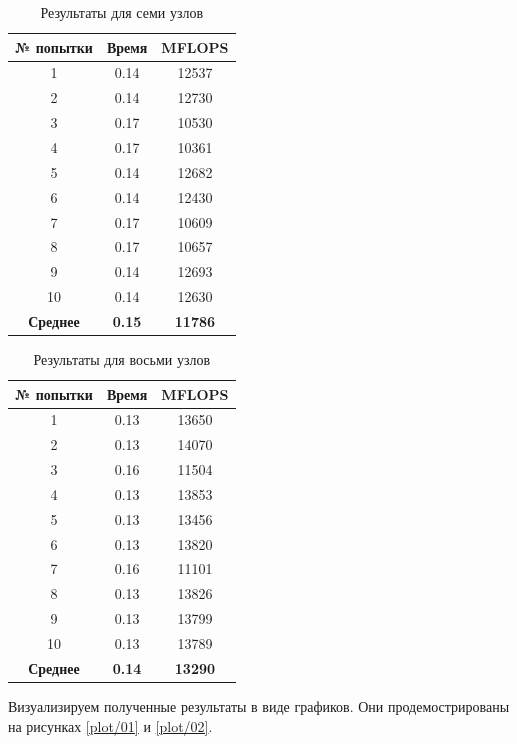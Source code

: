 \begin{table}[H]
	\caption{Результаты для семи узлов}
	\centering
	\begin{tabular}{|c|c|c|}
		\hline
		\textbf{№ попытки} & \textbf{Время} & \textbf{MFLOPS} \\\hline
		1 & 0.14 & 12537 \\ \hline
		2 & 0.14 & 12730 \\ \hline
		3 & 0.17 & 10530 \\ \hline
		4 & 0.17 & 10361 \\ \hline
		5 & 0.14 & 12682 \\ \hline
		6 & 0.14 & 12430 \\ \hline
		7 & 0.17 & 10609 \\ \hline
		8 & 0.17 & 10657 \\ \hline
		9 & 0.14 & 12693 \\ \hline
		10 & 0.14 & 12630 \\ \hline
		\textbf{Среднее} & \textbf{0.15} & \textbf{11786} \\\hline
	\end{tabular}
	\label{res/07}
\end{table}


\begin{table}[H]
	\caption{Результаты для восьми узлов}
	\centering
	\begin{tabular}{|c|c|c|}
		\hline
		\textbf{№ попытки} & \textbf{Время} & \textbf{MFLOPS} \\\hline
		1 & 0.13 & 13650 \\ \hline
		2 & 0.13 & 14070 \\ \hline
		3 & 0.16 & 11504 \\ \hline
		4 & 0.13 & 13853 \\ \hline
		5 & 0.13 & 13456 \\ \hline
		6 & 0.13 & 13820 \\ \hline
		7 & 0.16 & 11101 \\ \hline
		8 & 0.13 & 13826 \\ \hline
		9 & 0.13 & 13799 \\ \hline
		10 & 0.13 & 13789 \\ \hline
		\textbf{Среднее} & \textbf{0.14} & \textbf{13290} \\\hline
	\end{tabular}
	\label{res/08}
\end{table}


Визуализируем полученные результаты в виде графиков. Они продемострированы на рисунках \ref{plot/01} и \ref{plot/02}.


